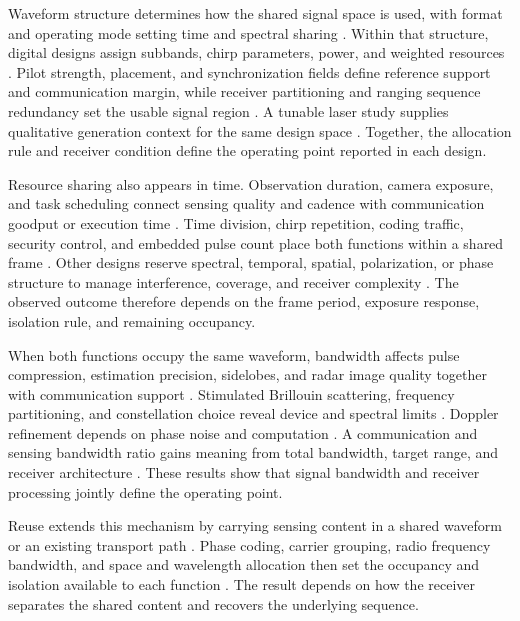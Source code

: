 Waveform structure determines how the shared signal space is used, with format
and operating mode setting time and spectral sharing
\cite{OISAC_SCR00011,OISAC_SCR00012,OISAC_SCR00083}. Within that structure,
digital designs assign subbands, chirp parameters, power, and weighted resources
\cite{OISAC_SCR00367,OISAC_SCR00626,OISAC_SCR00955,OISAC_SCR00956,OISAC_SCR01010}.
Pilot strength, placement, and synchronization fields define reference support
and communication margin, while receiver partitioning and ranging sequence
redundancy set the usable signal region
\cite{OISAC_SCR00086,OISAC_SCR00151,OISAC_SCR00369,OISAC_SCR00990,OISAC_SCR01054,OISAC_SCR01088}.
A tunable laser study supplies qualitative generation context for the same
design space \cite{OISAC_SCR00553}. Together, the allocation rule and receiver
condition define the operating point reported in each design.

Resource sharing also appears in time. Observation duration, camera exposure,
and task scheduling connect sensing quality and cadence with communication
goodput or execution time
\cite{OISAC_SCR00189,OISAC_SCR00273,OISAC_SCR00833}. Time division, chirp
repetition, coding traffic, security control, and embedded pulse count place
both functions within a shared frame
\cite{OISAC_SCR00836,OISAC_SCR01015,OISAC_SCR01034,OISAC_SCR01045,OISAC_SCR01019}.
Other designs reserve spectral, temporal, spatial, polarization, or phase
structure to manage interference, coverage, and receiver complexity
\cite{OISAC_SCR00177,OISAC_SCR00396,OISAC_SCR00916,OISAC_SCR00920,OISAC_SCR00953,OISAC_SCR00983}.
The observed outcome therefore depends on the frame period, exposure response,
isolation rule, and remaining occupancy.

When both functions occupy the same waveform, bandwidth affects pulse
compression, estimation precision, sidelobes, and radar image quality together
with communication support
\cite{OISAC_SCR00362,OISAC_SCR00884,OISAC_SCR00889,OISAC_SCR00891,OISAC_SCR00909}.
Stimulated Brillouin scattering, frequency partitioning, and constellation
choice reveal device and spectral limits
\cite{OISAC_SCR00965,OISAC_SCR00970,OISAC_SCR00988}. Doppler refinement depends
on phase noise and computation \cite{OISAC_SCR00900}. A communication and
sensing bandwidth ratio gains meaning from total bandwidth, target range, and
receiver architecture \cite{OISAC_SCR00784}. These results show that signal
bandwidth and receiver processing jointly define the operating point.

Reuse extends this mechanism by carrying sensing content in a shared waveform
or an existing transport path
\cite{OISAC_SCR00996,OISAC_SCR01004,OISAC_SCR01006}. Phase coding, carrier
grouping, radio frequency bandwidth, and space and wavelength allocation then
set the occupancy and isolation available to each function
\cite{OISAC_SCR01033,OISAC_SCR01036,OISAC_SCR01040,OISAC_SCR01086}. The result
depends on how the receiver separates the shared content and recovers the
underlying sequence.

